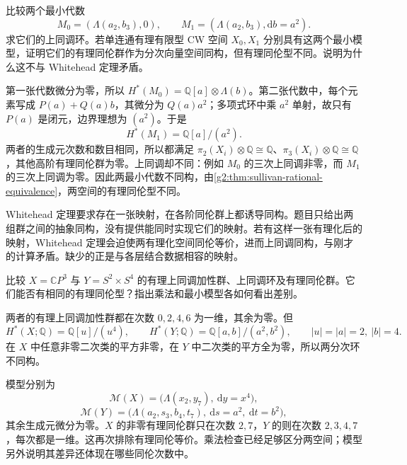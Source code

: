 \begin{exercise}\label{g2:ex:same-generators-different-differential}
	比较两个最小代数
	\[
		M_0=(\Lambda(a_2,b_3),0),\qquad
		M_1=(\Lambda(a_2,b_3),\mathrm db=a^2).
	\]
	求它们的上同调环。若单连通有理有限型 CW 空间 \(X_0,X_1\) 分别具有这两个最小模型，证明它们的有理同伦群作为分次向量空间同构，但有理同伦型不同。说明为什么这不与 Whitehead 定理矛盾。
\end{exercise}
\begin{solution}
	第一张代数微分为零，所以 \(H^*(M_0)=\mathbb Q[a]\otimes\Lambda(b)\)。第二张代数中，每个元素写成 \(P(a)+Q(a)b\)，其微分为 \(Q(a)a^2\)；多项式环中乘 \(a^2\) 单射，故只有 \(P(a)\) 是闭元，边界理想为 \((a^2)\)。于是
	\[
		H^*(M_1)=\mathbb Q[a]/(a^2).
	\]
	两者的生成元次数和数目相同，所以都满足 \(\pi_2(X_i)\otimes\mathbb Q\cong\mathbb Q\)、\(\pi_3(X_i)\otimes\mathbb Q\cong\mathbb Q\)，其他高阶有理同伦群为零。上同调却不同：例如 \(M_0\) 的三次上同调非零，而 \(M_1\) 的三次上同调为零。因此两最小代数不同构，由\cref{g2:thm:sullivan-rational-equivalence}，两空间的有理同伦型不同。

	Whitehead 定理要求存在一张映射，在各阶同伦群上都诱导同构。题目只给出两组群之间的抽象同构，没有提供能同时实现它们的映射。若有这样一张有理化后的映射，Whitehead 定理会迫使两有理化空间同伦等价，进而上同调同构，与刚才的计算矛盾。缺少的正是与各层结合数据相容的映射。
\end{solution}

\begin{exercise}\label{g2:ex:projective-product-rational-types}
	比较 \(X=\mathbb CP^3\) 与 \(Y=S^2\times S^4\) 的有理上同调加性群、上同调环及有理同伦群。它们能否有相同的有理同伦型？指出乘法和最小模型各如何看出差别。
\end{exercise}
\begin{solution}
	两者的有理上同调加性群都在次数 \(0,2,4,6\) 为一维，其余为零。但
	\[
		H^*(X;\mathbb Q)=\mathbb Q[u]/(u^4),\qquad
		H^*(Y;\mathbb Q)=\mathbb Q[a,b]/(a^2,b^2),\qquad |u|=|a|=2,\ |b|=4.
	\]
	在 \(X\) 中任意非零二次类的平方非零，在 \(Y\) 中二次类的平方全为零，所以两分次环不同构。

	模型分别为
	\[
		\mathcal M(X)=\bigl(\Lambda(x_2,y_7),\ \mathrm dy=x^4\bigr),
	\]
	\[
		\mathcal M(Y)=\bigl(\Lambda(a_2,s_3,b_4,t_7),\ \mathrm ds=a^2,\ \mathrm dt=b^2\bigr),
	\]
	其余生成元微分为零。\(X\) 的非零有理同伦群只在次数 \(2,7\)，\(Y\) 的则在次数 \(2,3,4,7\)，每次都是一维。这再次排除有理同伦等价。乘法检查已经足够区分两空间；模型另外说明其差异还体现在哪些同伦次数中。
\end{solution}

